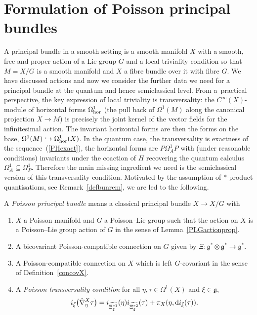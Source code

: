 \documentclass[10pt,a4paper]{amsart}
\numberwithin{equation}{section}
\newcommand{\<}{{\langle}}
\renewcommand{\>}{{\rangle}}
\newcommand{\tens}{\otimes}
\newcommand{\extd}{{\rm d}}
\newcommand{\cg}{{\mathfrak{g}}}
\begin{document}
\section{Formulation of Poisson principal bundles}\label{PPB}

A principal bundle in a smooth setting is a smooth manifold $X$ with a smooth, free and proper action of a Lie group $G$ and a local triviality condition so that $M=X/G$ is a smooth manifold and $X$ a fibre bundle over it with fibre $G$. We have discussed actions and now we consider the further data we need for a principal bundle at the quantum and hence semiclassical level. From a~practical perspective, the key expression of local triviality is transversality: the $C^\infty(X)$-module of horizontal forms $\Omega^1_{\rm hor}$ (the pull back of $\Omega^1(M)$ along the canonical projection $X\to M$) is precisely the joint kernel of the vector fields for the infinitesimal action. The invariant horizontal forms are then the forms on the base, $\Omega^1(M)\hookrightarrow\Omega^1_{\rm hor}(X)$. In the quantum case, the transversality is exactness of the sequence~(\ref{PHexact}), the horizontal forms are $P\Omega^1_AP$ with (under reasonable conditions) invariants under the coaction of $H$ recovering the quantum calculus $\Omega^1_A\subseteq \Omega^1_P$. Therefore the main missing ingredient we need is the semiclassical version of this transversality condition. Motivated by the assumption of $*$-product quantisations, see Remark~\ref{defbunrem}, we are led to the following.
\begin{Definition}\label{PPBdef}
A {\em Poisson principal bundle} means a classical principal bundle $X\to X/G$ with
\begin{enumerate}\itemsep=0pt
\item $X$ a Poisson manifold and $G$ a Poisson--Lie group such that the action on $X$ is a Poisson--Lie group action of $G$ in the sense of Lemma~\ref{PLGactionprop}.
\item A bicovariant Poisson-compatible connection on $G$ given by $\Xi\colon \cg^*\tens\cg^*\to\cg^*$.
\item A Poisson-compatible connection on $X$ which is left $G$-covariant in the sense of Definition~\ref{concovX}.
\item A {\em Poisson transversality condition} for all $\eta,\tau\in \Omega^1(X)$ and $\xi\in\cg$,
\begin{equation*}
i_{\tilde\xi}\big(\hat\nabla^X_{\eta}\tau\big)=i_{\widetilde{\Xi^{*1}_\xi}}(\eta)i_{\widetilde{\Xi^{*2}_\xi}}(\tau)+\pi_X(\eta,\extd i_{\tilde\xi}(\tau)).
\end{equation*}
\end{enumerate}
\end{Definition}
\end{document}

